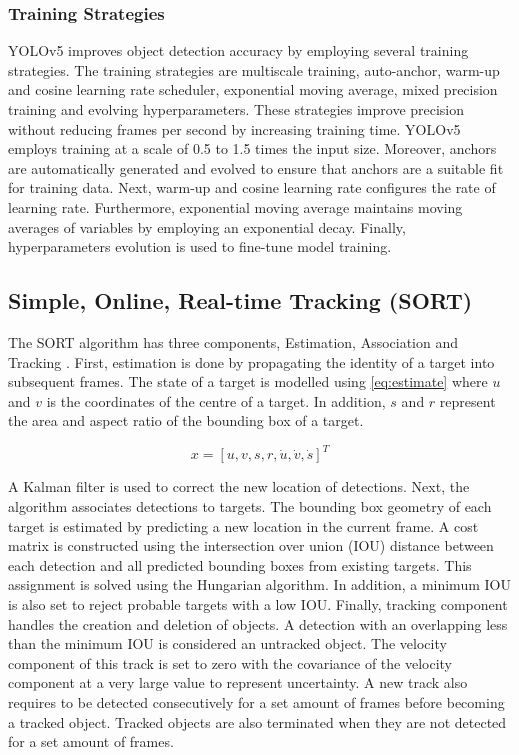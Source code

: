 \documentclass[12pt,a4paper,fleqn]{report}
\begin{document}
\subsubsection{Training Strategies}
YOLOv5 improves object detection accuracy by employing several training strategies.
The training strategies are multiscale training, auto-anchor, warm-up and cosine learning rate
scheduler, exponential moving average, mixed precision training and evolving hyperparameters.
These strategies improve precision without reducing frames per second by increasing training time.
YOLOv5 employs training at a scale of 0.5 to 1.5 times the input size. 
Moreover, anchors are automatically generated and evolved to ensure that anchors are a suitable fit for 
training data.
Next, warm-up and cosine learning rate configures the rate of learning rate.
Furthermore, exponential moving average maintains moving averages of variables by employing an exponential decay.
Finally, hyperparameters evolution is used to fine-tune model training.


\subsection{Simple, Online, Real-time Tracking (SORT)}
The SORT algorithm has three components, Estimation, Association and Tracking \cite{sort:2016}.
First, estimation is done by propagating the identity of a target into subsequent frames. 
The state of a target is modelled using \ref{eq:estimate} where $u$ and $v$ is the coordinates of
the centre of a target.
In addition, $s$ and $r$ represent the area and aspect ratio of the bounding box of a target.

\begin{equation}
    x = [ u, v, s, r, \dot{u}, \dot{v}, \dot{s}] ^ T
    \label{eq:estimate}
\end{equation}

A Kalman filter is used to correct the new location of detections.
Next, the algorithm associates detections to targets.
The bounding box geometry of each target is estimated by predicting a new location in the current
frame.
A cost matrix is constructed using the intersection over union (IOU) distance between each detection
and all predicted bounding boxes from existing targets.
This assignment is solved using the Hungarian algorithm.
In addition, a minimum IOU is also set to reject probable targets with a low IOU.
Finally, tracking component handles the creation and deletion of objects.
A detection with an overlapping less than the minimum IOU is considered an untracked object.
The velocity component of this track is set to zero with the covariance of the velocity component at
a very large value to represent uncertainty. 
A new track also requires to be detected consecutively for a set amount of frames before becoming a tracked
object.
Tracked objects are also terminated when they are not detected for a set amount of frames.
\end{document}
